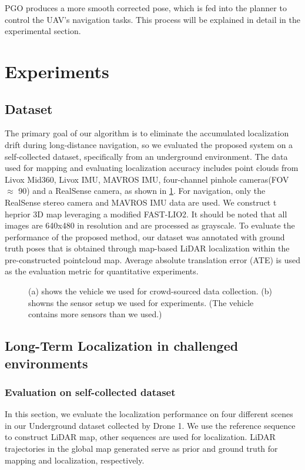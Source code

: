 \documentclass[conference]{./support/ieeeconf}
\begin{document}
PGO produces a more smooth corrected pose, which is fed into the planner to control the UAV's navigation tasks. This process will be explained in detail in the experimental section.



\section{Experiments}
\subsection{Dataset}
The primary goal of our algorithm is to eliminate the accumulated localization drift during long-distance navigation, so we evaluated the proposed system on a self-collected dataset, specifically from an underground environment.  The data used for mapping and evaluating localization accuracy includes point clouds from Livox Mid360, Livox IMU, MAVROS IMU, four-channel pinhole cameras(FOV $\approx$ 90) and a RealSense camera, as shown in \ref{fig:drones}. For navigation, only the RealSense stereo camera and MAVROS IMU data are used. We construct t heprior 3D map leveraging a modified FAST-LIO2. It should be noted that all images are 640x480 in resolution and are processed as grayscale. To evaluate the performance of the proposed method, our dataset was annotated with ground truth poses that is obtained through map-based LiDAR localization within the pre-constructed pointcloud map. Average absolute translation error (ATE) is used as the evaluation metric for quantitative experiments.

\begin{figure}[t]
	\centering
	\caption{(a) shows the vehicle we used for crowd-sourced data collection.
		(b) showns the sensor setup we used for experiments. (The vehicle contains more sensors than we used.)}
	\label{fig:drones}
\end {figure}


\subsection{Long-Term Localization in challenged environments}

\subsubsection{Evaluation on self-collected dataset}
In this section, we evaluate the localization performance on four different scenes in our Underground dataset collected by Drone 1. We use the reference sequence to construct LiDAR map, other sequences are used for localization. LiDAR trajectories in the global map generated serve as prior and ground truth for mapping and localization, respectively.
\end{document}
